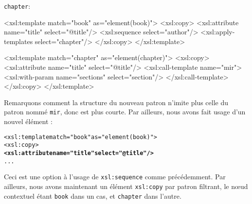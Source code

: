 \texttt{chapter}:
\begin{sverb}
  <xsl:template match="book" as="element(book)">
    <xsl:copy>
      <xsl:attribute name="title" select="@title"/>
      <xsl:sequence select="author"/>
      <xsl:apply-templates select="chapter"/>
    </xsl:copy>
  </xsl:template>

  <xsl:template match="chapter" as="element(chapter)">
    <xsl:copy>
      <xsl:attribute name="title" select="@title"/>
      <xsl:call-template name="mir">
        <xsl:with-param name="sections" select="section"/>
      </xsl:call-template>
    </xsl:copy>
  </xsl:template>
\end{sverb}
Remarquons comment la structure du nouveau patron n'imite plus celle
du patron nommé \texttt{mir}, donc est plus courte. Par ailleurs, nous
avons fait usage d'un nouvel élément \XSLT:
\begin{alltt}
\small <xsl:template match="book" as="element(book)">
    <xsl:copy>
      \textbf{<xsl:attribute name="title" select="@title"/>}
      ...
\end{alltt}
Ceci est une option à l'usage de \texttt{xsl:sequence} comme
précédemment. Par ailleurs, nous avons maintenant un élément
\texttt{xsl:copy} par patron filtrant, le n{\oe}ud contextuel étant
\texttt{book} dans un cas, et \texttt{chapter} dans l'autre.

